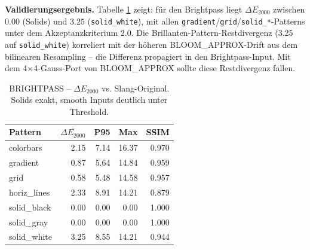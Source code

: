\documentclass[11pt, a4paper]{article}
\newcommand{\tableheadercolor}{\rowcolor{hkared}}
\newcommand{\thw}[1]{\color{white}\textbf{#1}}  %
\begin{document}
\vspace{.5cm}
\textbf{Validierungsergebnis.} Tabelle \ref{tab:dE-brightpass} zeigt: f\"ur den Brightpass liegt $\overline{\Delta E_{2000}}$ zwischen $0.00$ (Solids) und $3.25$ (\texttt{solid\_white}), mit allen \texttt{gradient}/\texttt{grid}/\texttt{solid\_*}-Patterns unter dem Akzeptanzkriterium $2.0$. Die Brillanten-Pattern-Restdivergenz (3.25 auf \texttt{solid\_white}) korreliert mit der h\"oheren BLOOM\_APPROX-Drift aus dem bilinearen Resampling -- die Differenz propagiert in den Brightpass-Input. Mit dem 4$\times$4-Gauss-Port von BLOOM\_APPROX sollte diese Restdivergenz fallen.

\vspace{.25cm}
\begin{table}[H]
\centering
\small
{}
\begin{tabularx}{\textwidth}{lrrrr}
    \toprule
    \tableheadercolor \thw{Pattern} & \thw{$\overline{\Delta E_{2000}}$} & \thw{P95} & \thw{Max} & \thw{SSIM} \\
    \midrule
    colorbars   & 2.15 &  7.14 & 16.37 & 0.970 \\
    gradient    & 0.87 &  5.64 & 14.84 & 0.959 \\
    grid        & 0.58 &  5.48 & 14.58 & 0.957 \\
    horiz\_lines & 2.33 &  8.91 & 14.21 & 0.879 \\
    solid\_black & 0.00 &  0.00 &  0.00 & 1.000 \\
    solid\_gray  & 0.00 &  0.00 &  0.00 & 1.000 \\
    solid\_white & 3.25 &  8.55 & 14.21 & 0.944 \\
    \bottomrule
\end{tabularx}
 \vspace{.25cm}
\caption{BRIGHTPASS -- $\Delta E_{2000}$ vs. Slang-Original. Solids exakt, smooth Inputs deutlich unter Threshold.}
\label{tab:dE-brightpass}
\end{table}

\vspace{.5cm}
\end{document}
